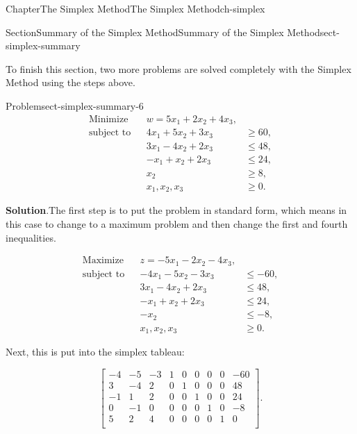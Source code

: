 \documentclass[oneside,10pt,]{book}
\newcommand{\blocktitlefont}{\relax}
\numberwithin{equation}{section}
\newcommand{\amp}{&}
\begin{document}
\begin{chapterptx}{Chapter}{The Simplex Method}{}{The Simplex Method}{}{}{ch-simplex}
\begin{sectionptx}{Section}{Summary of the Simplex Method}{}{Summary of the Simplex Method}{}{}{sect-simplex-summary}
\par
To finish this section, two more problems are solved completely with the Simplex Method using the steps above.%
\begin{problem}{Problem}{}{sect-simplex-summary-6}%
%
\begin{equation*}
\begin{aligned} \text{Minimize} \amp \amp w = 5 x_1 + 2 x_2 + 4 x_3, \amp \\ \text{subject to} \amp \amp 4 x_1 + 5 x_2 + 3 x_3 \amp \geq 60, \\ \amp \amp 3 x_1 - 4x_2 +2 x_3 \amp \leq 48, \\ \amp \amp -x_1 + x_2 + 2x_3 \amp \leq 24, \\ \amp \amp x_2 \amp \geq 8, \\ \amp \amp x_1, x_2, x_3 \amp \geq 0.
\end{aligned}
\end{equation*}
%
\par\smallskip%
\noindent\textbf{\blocktitlefont Solution}.\hypertarget{sect-simplex-summary-6-2}{}\quad{}The first step is to put the problem in standard form, which means in this case to change to a maximum problem and then change the first and fourth inequalities.%
\par
%
\begin{equation*}
\begin{aligned} \text{Maximize} \amp \amp z = -5 x_1 - 2 x_2 - 4 x_3, \amp \\ \text{subject to} \amp \amp -4 x_1 - 5 x_2 - 3 x_3 \amp \leq -60, \\ \amp \amp 3 x_1 - 4x_2 +2 x_3 \amp \leq 48, \\ \amp \amp -x_1 + x_2 + 2x_3 \amp \leq 24, \\ \amp \amp -x_2 \amp \leq -8, \\ \amp \amp x_1, x_2, x_3 \amp \geq 0.
\end{aligned}
\end{equation*}
%
\par
Next, this is put into the simplex tableau:%
\par
%
\begin{equation*}
\left[\begin{array}{rrr|rrrrr|r} -4 \amp -5 \amp -3 \amp 1 \amp 0 \amp 0 \amp 0 \amp 0 \amp -60\\ 3 \amp -4 \amp 2 \amp 0 \amp 1 \amp 0 \amp 0 \amp 0 \amp 48\\ -1 \amp 1 \amp 2 \amp 0 \amp 0 \amp 1 \amp 0 \amp 0 \amp 24\\ 0 \amp -1 \amp 0 \amp 0 \amp 0 \amp 0 \amp 1 \amp 0 \amp -8\\ \hline 5 \amp 2 \amp 4 \amp 0 \amp 0 \amp 0 \amp 0 \amp 1 \amp 0\\ \end{array} \right] .

\end{equation*}
\end{problem}
\end{sectionptx}
\end{chapterptx}
\end{document}
